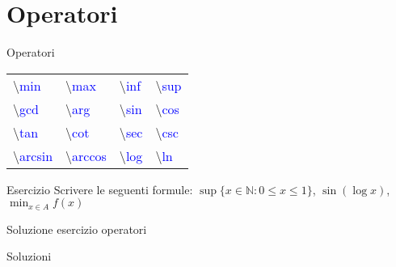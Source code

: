\section{Operatori}
  \begin{frame}{Operatori}

	\begin{table}[h!]
	\begin{tabular}{p{2.3cm} p{2.3cm} p{2.3cm} p{2.3cm}}
	\hline
	\textbackslash \textcolor{blue}{min} & \textbackslash \textcolor{blue}{max} & \textbackslash \textcolor{blue}{inf} & \textbackslash \textcolor{blue}{sup} \\[0.4cm]
	\textbackslash \textcolor{blue}{gcd} & \textbackslash \textcolor{blue}{arg} & \textbackslash \textcolor{blue}{sin} & \textbackslash \textcolor{blue}{cos} \\[0.4cm]
	\textbackslash \textcolor{blue}{tan} & \textbackslash \textcolor{blue}{cot} & \textbackslash \textcolor{blue}{sec} & \textbackslash \textcolor{blue}{csc} \\[0.4cm]
	\textbackslash \textcolor{blue}{arcsin} & \textbackslash \textcolor{blue}{arccos} & \textbackslash \textcolor{blue}{log} & \textbackslash \textcolor{blue}{ln} \\
	\hline
	\end{tabular}
	\end{table}

	\begin{block}{Esercizio}
	Scrivere le seguenti formule: $\sup \{ x \in \mathbb{N} : 0 \leq x \leq 1 \} $, $\sin (\log x)$, $\min_{x\in A} f(x)$
	\end{block}

\end{frame}

\begin{frame}{Soluzione esercizio operatori}

    \begin{exampleblock}{Soluzioni}
      
    \end{exampleblock}

\end{frame}

